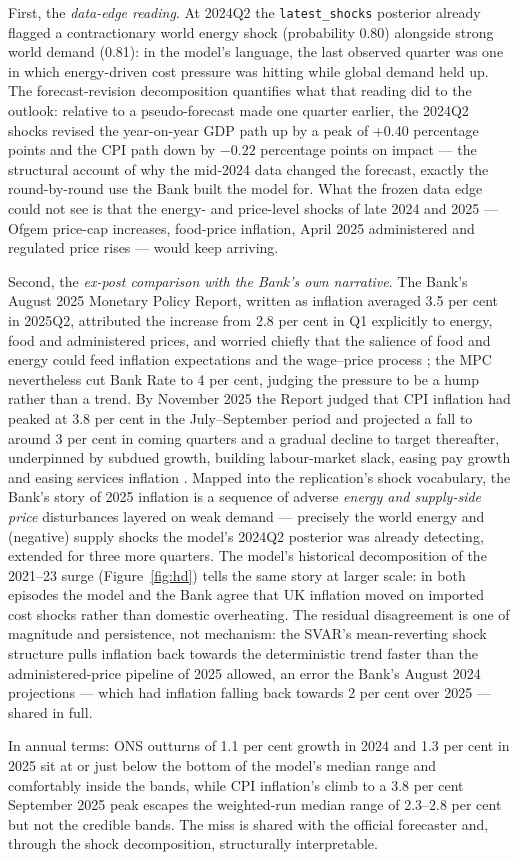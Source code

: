 First, the \emph{data-edge reading}. At 2024Q2 the \texttt{latest\_shocks} posterior already flagged a contractionary world energy shock (probability 0.80) alongside strong world demand (0.81): in the model's language, the last observed quarter was one in which energy-driven cost pressure was hitting while global demand held up. The forecast-revision decomposition quantifies what that reading did to the outlook: relative to a pseudo-forecast made one quarter earlier, the 2024Q2 shocks revised the year-on-year GDP path up by a peak of $+0.40$ percentage points and the CPI path down by $-0.22$ percentage points on impact --- the structural account of why the mid-2024 data changed the forecast, exactly the round-by-round use the Bank built the model for. What the frozen data edge could not see is that the energy- and price-level shocks of late 2024 and 2025 --- Ofgem price-cap increases, food-price inflation, April 2025 administered and regulated price rises --- would keep arriving.

Second, the \emph{ex-post comparison with the Bank's own narrative}. The Bank's August 2025 Monetary Policy Report, written as inflation averaged 3.5 per cent in 2025Q2, attributed the increase from 2.8 per cent in Q1 explicitly to energy, food and administered prices, and worried chiefly that the salience of food and energy could feed inflation expectations and the wage--price process \citep{boe2025mpr_aug}; the MPC nevertheless cut Bank Rate to 4 per cent, judging the pressure to be a hump rather than a trend. By November 2025 the Report judged that CPI inflation had peaked at 3.8 per cent in the July--September period and projected a fall to around 3 per cent in coming quarters and a gradual decline to target thereafter, underpinned by subdued growth, building labour-market slack, easing pay growth and easing services inflation \citep{boe2025mpr_nov}. Mapped into the replication's shock vocabulary, the Bank's story of 2025 inflation is a sequence of adverse \emph{energy and supply-side price} disturbances layered on weak demand --- precisely the world energy and (negative) supply shocks the model's 2024Q2 posterior was already detecting, extended for three more quarters. The model's historical decomposition of the 2021--23 surge (Figure~\ref{fig:hd}) tells the same story at larger scale: in both episodes the model and the Bank agree that UK inflation moved on imported cost shocks rather than domestic overheating. The residual disagreement is one of magnitude and persistence, not mechanism: the SVAR's mean-reverting shock structure pulls inflation back towards the deterministic trend faster than the administered-price pipeline of 2025 allowed, an error the Bank's August 2024 projections --- which had inflation falling back towards 2 per cent over 2025 \citep{boe2024mpr} --- shared in full.

In annual terms: ONS outturns of 1.1 per cent growth in 2024 and 1.3 per cent in 2025 sit at or just below the bottom of the model's median range and comfortably inside the bands, while CPI inflation's climb to a 3.8 per cent September 2025 peak escapes the weighted-run median range of 2.3--2.8 per cent but not the credible bands. The miss is shared with the official forecaster and, through the shock decomposition, structurally interpretable.
